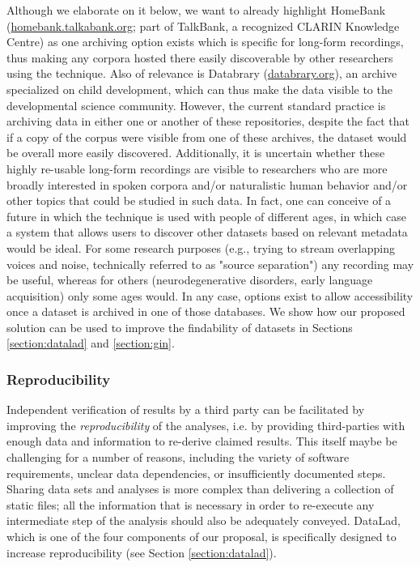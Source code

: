 \documentclass[smallextended]{svjour3}       %
\begin{document}
Although we elaborate on it below, we want to already highlight HomeBank (\url{homebank.talkabank.org}; part of TalkBank, a recognized CLARIN Knowledge Centre) as one archiving option exists which is specific for long-form recordings, thus making any corpora hosted  there easily discoverable by other researchers using the technique. Also of relevance is Databrary (\url{databrary.org}), an archive specialized on child development, which can thus make the data visible to the developmental science community. However, the current standard practice  is archiving data in either one or another of these repositories, despite the fact that if a copy of the corpus were visible from one of these archives, the dataset would be overall more easily discovered. Additionally, it is uncertain whether these highly re-usable long-form recordings are visible to researchers who are more broadly interested in spoken corpora and/or naturalistic human behavior and/or other topics that could be studied in such data. In fact, one can conceive of a future in which the technique is used with people of different ages, in which case a system that allows users to discover other datasets based on relevant metadata would be ideal. For some research purposes (e.g., trying to stream overlapping voices and noise, technically referred to as "source separation") any recording may be useful, whereas for others (neurodegenerative disorders, early language acquisition) only some ages would. In any case, options exist to allow accessibility once a dataset is archived in one of those databases. We show how our proposed solution can be used to improve the findability of datasets in Sections \ref{section:datalad} and \ref{section:gin}.

\subsubsection*{Reproducibility}

Independent verification of results by a third party can be facilitated by improving the \emph{reproducibility} of the analyses, i.e. by providing third-parties with enough data and information to re-derive claimed results. This itself maybe be challenging for a number of reasons, including the variety of software requirements, unclear data dependencies, or insufficiently documented steps. Sharing data sets and analyses is more complex than delivering a collection of static files; all the information that is necessary in order to re-execute any intermediate step of the analysis should also be adequately conveyed. DataLad, which is one of the four components of our proposal, is specifically designed to increase reproducibility (see Section \ref{section:datalad}).
\end{document}
